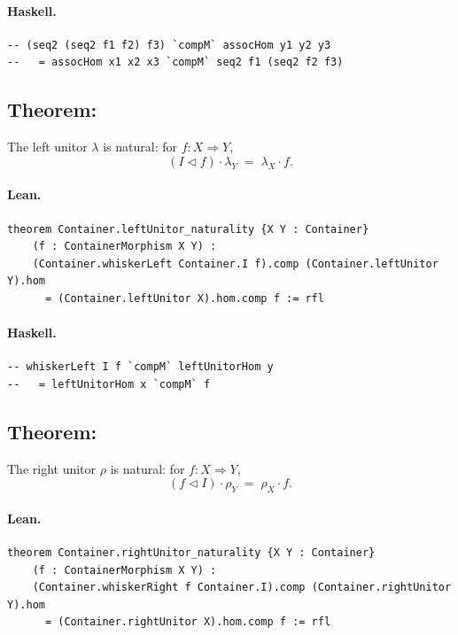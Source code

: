 \documentclass[11pt,a4paper]{article}
\begin{document}
\paragraph{Haskell.}
\begin{lstlisting}[style=haskell]
-- (seq2 (seq2 f1 f2) f3) `compM` assocHom y1 y2 y3
--   = assocHom x1 x2 x3 `compM` seq2 f1 (seq2 f2 f3)
\end{lstlisting}


\subsection{Theorem: }

\begin{thm}
The left unitor $\lambda$ is natural: for $f : X \Rightarrow Y$,
\[
  (I \triangleleft f) \cdot \lambda_Y \;=\; \lambda_X \cdot f.
\]
\end{thm}

\paragraph{Lean.}
\begin{lstlisting}[style=lean]
theorem Container.leftUnitor_naturality {X Y : Container}
    (f : ContainerMorphism X Y) :
    (Container.whiskerLeft Container.I f).comp (Container.leftUnitor Y).hom
      = (Container.leftUnitor X).hom.comp f := rfl
\end{lstlisting}

\paragraph{Haskell.}
\begin{lstlisting}[style=haskell]
-- whiskerLeft I f `compM` leftUnitorHom y
--   = leftUnitorHom x `compM` f
\end{lstlisting}


\subsection{Theorem: }

\begin{thm}
The right unitor $\rho$ is natural: for $f : X \Rightarrow Y$,
\[
  (f \triangleleft I) \cdot \rho_Y \;=\; \rho_X \cdot f.
\]
\end{thm}

\paragraph{Lean.}
\begin{lstlisting}[style=lean]
theorem Container.rightUnitor_naturality {X Y : Container}
    (f : ContainerMorphism X Y) :
    (Container.whiskerRight f Container.I).comp (Container.rightUnitor Y).hom
      = (Container.rightUnitor X).hom.comp f := rfl
\end{lstlisting}
\end{document}
